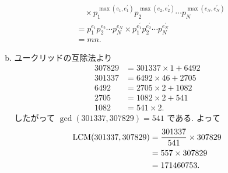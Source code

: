 \begin{enumerate}[5.1]
\begin{enumerate}[(a)]
\begin{align*}
    & \quad \times p_1^{\max(e_1, e_1^\prime)} p_2^{\max(e_2, e_2^\prime)} \cdots
          p_N^{\max(e_N, e_N^\prime)} \\
    &= p_1^{e_1} p_2^{e_2} \cdots p_N^{e_N} \times p_1^{e_1^\prime}p_2^{e_2^\prime}
      \cdots p_N^{e_N^\prime} \\
    &= mn.
\end{align*} %
\item %
ユークリッドの互除法より
\begin{align*}
  307829 &= 301337 \times 1  + 6492 \\
  301337 &= 6492   \times 46 + 2705 \\
  6492   &= 2705   \times 2  + 1082 \\
  2705   &= 1082   \times 2  + 541  \\
  1082   &= 541    \times 2.
\end{align*}
したがって $\gcd(301337, 307829) = 541$ である.
よって
\begin{align*}
\LCM(301337, 307829)
  &= \frac{301337}{541} \times 307829 \\
  &= 557 \times 307829 \\
  &= 171460753.
\end{align*}
\end{enumerate} %
\end{enumerate} %
